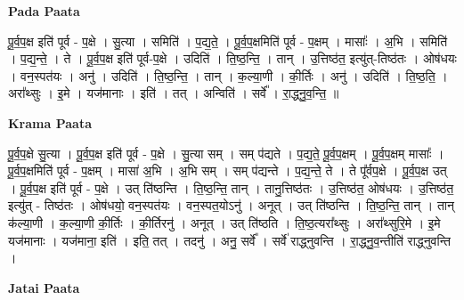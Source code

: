 \documentclass[17pt]{extarticle}
\begin{document}
\textbf{Pada Paata} \newline

पू॒र्व॒प॒क्ष इति॑ पूर्व - प॒क्षे । सु॒त्या । समिति॑ । प॒द्य॒ते॒ । पू॒र्व॒प॒क्षमिति॑ पूर्व - प॒क्षम् । मासाः᳚ । अ॒भि । समिति॑ । प॒द्य॒न्ते॒ । ते । पू॒र्व॒प॒क्ष इति॑ पूर्व-प॒क्षे । उदिति॑ । ति॒ष्ठ॒न्ति॒ । तान् । उ॒त्तिष्ठ॑त॒ इत्यु॑त्-तिष्ठ॑तः । ओष॑धयः । वन॒स्पत॑यः । अनु॑ । उदिति॑ । ति॒ष्ठ॒न्ति॒ । तान् । क॒ल्या॒णी । की॒र्तिः । अनु॑ । उदिति॑ । ति॒ष्ठ॒ति॒ । अरा᳚थ्सुः । इ॒मे । यज॑मानाः । इति॑ । तत् । अन्विति॑ । सर्वे᳚ । रा॒द्ध्नु॒व॒न्ति॒ ॥  \newline


\textbf{Krama Paata} \newline

पू॒र्व॒प॒क्षे सु॒त्या । पू॒र्व॒प॒क्ष इति॑ पूर्व - प॒क्षे । सु॒त्या सम् । सम् प॑द्यते । प॒द्य॒ते॒ पू॒र्व॒प॒क्षम् । पू॒र्व॒प॒क्षम् मासाः᳚ । पू॒र्व॒प॒क्षमिति॑ पूर्व - प॒क्षम् । मासा॑ अ॒भि । अ॒भि सम् । सम् प॑द्यन्ते । प॒द्य॒न्ते॒ ते । ते पू᳚र्वप॒क्षे । पू॒र्व॒प॒क्ष उत् । पू॒र्व॒प॒क्ष इति॑ पूर्व - प॒क्षे । उत् ति॑ष्ठन्ति । ति॒ष्ठ॒न्ति॒ तान् । तानु॒त्तिष्ठ॑तः । उ॒त्तिष्ठ॑त॒ ओष॑धयः । उ॒त्तिष्ठ॑त॒ इत्यु॑त् - तिष्ठ॑तः । ओष॑धयो॒ वन॒स्पत॑यः । वन॒स्पत॒योऽनु॑ । अनूत् । उत् ति॑ष्ठन्ति । ति॒ष्ठ॒न्ति॒ तान् । तान् क॑ल्या॒णी । क॒ल्या॒णी की॒र्तिः । की॒र्तिरनु॑ । अनूत् । उत् ति॑ष्ठति । ति॒ष्ठ॒त्यरा᳚थ्सुः । अरा᳚थ्सुरि॒मे । इ॒मे यज॑मानाः । यज॑माना॒ इति॑ । इति॒ तत् । तदनु॑ । अनु॒ सर्वे᳚ । सर्वे॑ राद्ध्नुवन्ति । रा॒द्ध्नु॒व॒न्तीति॑ राद्ध्नुवन्ति । \newline

\textbf{Jatai Paata} \newline
\end{document}

